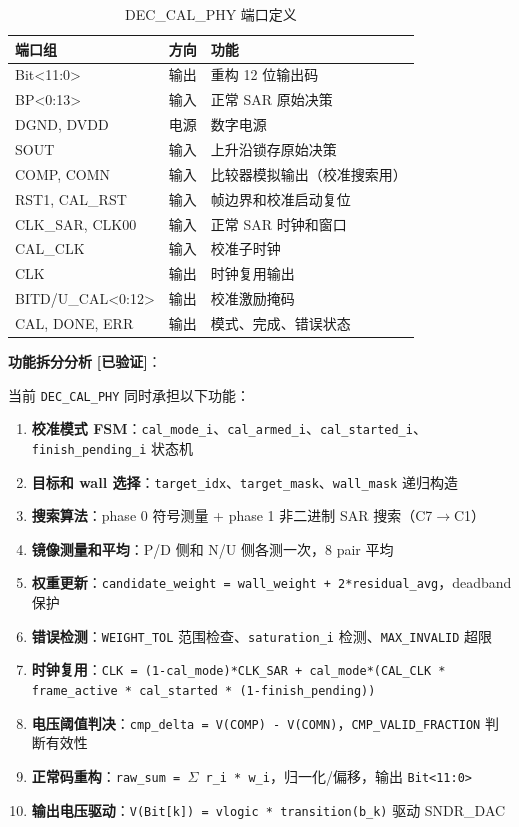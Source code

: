 \documentclass[UTF8,a4paper,11pt]{ctexart}
\newcommand{\verified}{\textcolor{verifiedgreen}{\textbf{[已验证]}}}
\begin{document}
\begin{table}[H]
\centering
\caption{DEC\_CAL\_PHY 端口定义}
\label{tab:dec-ports}
\begin{tabular}{lll}
\toprule
端口组 & 方向 & 功能 \\
\midrule
Bit<11:0>                  & 输出 & 重构 12 位输出码 \\
BP<0:13>                   & 输入 & 正常 SAR 原始决策 \\
DGND, DVDD                 & 电源 & 数字电源 \\
SOUT                       & 输入 & 上升沿锁存原始决策 \\
COMP, COMN                 & 输入 & 比较器模拟输出（校准搜索用） \\
RST1, CAL\_RST             & 输入 & 帧边界和校准启动复位 \\
CLK\_SAR, CLK00            & 输入 & 正常 SAR 时钟和窗口 \\
CAL\_CLK                   & 输入 & 校准子时钟 \\
CLK                        & 输出 & 时钟复用输出 \\
BITD/U\_CAL<0:12>          & 输出 & 校准激励掩码 \\
CAL, DONE, ERR             & 输出 & 模式、完成、错误状态 \\
\bottomrule
\end{tabular}
\end{table}

\textbf{功能拆分分析} \verified：

当前 \texttt{DEC\_CAL\_PHY} 同时承担以下功能：

\begin{enumerate}[leftmargin=2em]
\item \textbf{校准模式 FSM}：\texttt{cal\_mode\_i}、\texttt{cal\_armed\_i}、\texttt{cal\_started\_i}、\texttt{finish\_pending\_i} 状态机
\item \textbf{目标和 wall 选择}：\texttt{target\_idx}、\texttt{target\_mask}、\texttt{wall\_mask} 递归构造
\item \textbf{搜索算法}：phase 0 符号测量 + phase 1 非二进制 SAR 搜索（C7$\rightarrow$C1）
\item \textbf{镜像测量和平均}：P/D 侧和 N/U 侧各测一次，8 pair 平均
\item \textbf{权重更新}：\texttt{candidate\_weight = wall\_weight + 2*residual\_avg}，deadband 保护
\item \textbf{错误检测}：\texttt{WEIGHT\_TOL} 范围检查、\texttt{saturation\_i} 检测、\texttt{MAX\_INVALID} 超限
\item \textbf{时钟复用}：\texttt{CLK = (1-cal\_mode)*CLK\_SAR + cal\_mode*(CAL\_CLK * frame\_active * cal\_started * (1-finish\_pending))}
\item \textbf{电压阈值判决}：\texttt{cmp\_delta = V(COMP) - V(COMN)}，\texttt{CMP\_VALID\_FRACTION} 判断有效性
\item \textbf{正常码重构}：\texttt{raw\_sum = $\Sigma$ r\_i * w\_i}，归一化/偏移，输出 \texttt{Bit<11:0>}
\item \textbf{输出电压驱动}：\texttt{V(Bit[k]) = vlogic * transition(b\_k)} 驱动 SNDR\_DAC
\end{enumerate}
\end{document}

